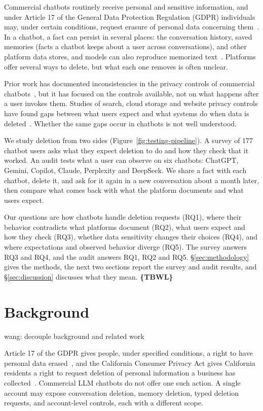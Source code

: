 \documentclass[conference,compsoc]{IEEEtran}
\newcommand{\xw}[1] {{\color{red}wang: #1}}
\begin{document}
Commercial chatbots routinely receive personal and sensitive information, and under Article 17 of the General Data Protection Regulation (GDPR) individuals may, under certain conditions, request erasure of personal data concerning them~\cite{gdpr2016}.
In a chatbot, a fact can persist in several places: the conversation history, saved memories (facts a chatbot keeps about a user across conversations), and other platform data stores, and models can also reproduce memorized text~\cite{carlini2021extracting}.
Platforms offer several ways to delete, but what each one removes is often unclear.

Prior work has documented inconsistencies in the privacy controls of commercial chatbots~\cite{li2026privacy}, but it has focused on the controls available, not on what happens after a user invokes them.
Studies of search, cloud storage and website privacy controls have found gaps between what users expect and what systems do when data is deleted~\cite{bertram2019five,kang2015mydata,ramokapane2017stupid,habib2019empirical}.
Whether the same gaps occur in chatbots is not well understood.

We study deletion from two sides (Figure~\ref{fig:testing-pipeline}).
A survey of 177 chatbot users asks what they expect deletion to do and how they check that it worked.
An audit tests what a user can observe on six chatbots: ChatGPT, Gemini, Copilot, Claude, Perplexity and DeepSeek.
We share a fact with each chatbot, delete it, and ask for it again in a new conversation about a month later, then compare what comes back with what the platform documents and what users expect.

Our questions are how chatbots handle deletion requests (RQ1), where their behavior contradicts what platforms document (RQ2), what users expect and how they check (RQ3), whether data sensitivity changes their choices (RQ4), and where expectations and observed behavior diverge (RQ5).
The survey answers RQ3 and RQ4, and the audit answers RQ1, RQ2 and RQ5.
\S\ref{sec:methodology} gives the methods, the next two sections report the survey and audit results, and \S\ref{sec:discussion} discusses what they mean. \textbf{\{TBWL\}}


\section{Background}
\label{sec:background}

\xw{decouple background and related work}

Article 17 of the GDPR gives people, under specified conditions, a right to have personal data erased~\cite{gdpr2016}, and the California Consumer Privacy Act gives California residents a right to request deletion of personal information a business has collected~\cite{ccpa2018}. Commercial LLM chatbots do not offer one such action. A single account may expose conversation deletion, memory deletion, typed deletion requests, and account-level controls, each with a different scope.
\end{document}
